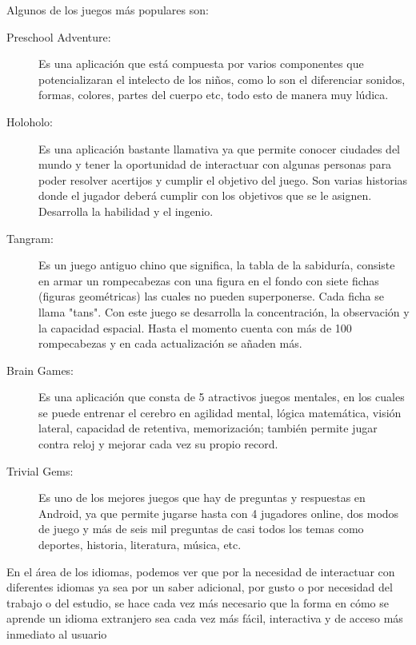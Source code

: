 Algunos de los juegos más populares son:
\begin{description}
	\item[Preschool Adventure:]
		Es una aplicación que está compuesta por varios componentes que potencializaran el intelecto de los niños, como lo son el diferenciar sonidos, formas, colores, partes del 
		cuerpo etc, todo esto de manera muy lúdica.
		
	\item[Holoholo:]
		Es una aplicación bastante llamativa ya que permite conocer ciudades del mundo y tener la oportunidad de interactuar con algunas personas para poder resolver acertijos y 
		cumplir el objetivo del juego. Son varias historias donde el jugador deberá cumplir con los objetivos que se le asignen. Desarrolla la habilidad y el ingenio.
	
	\item[Tangram:]
		Es un juego antiguo chino que significa, la tabla de la sabiduría, consiste en armar un rompecabezas con una figura en el fondo con siete fichas (figuras geométricas) las 	
		cuales no pueden superponerse. Cada ficha se llama "tans". Con este juego se desarrolla la concentración, la observación y la capacidad espacial. Hasta el momento cuenta 
		con más de 100 rompecabezas y en cada actualización se añaden más.
	
	\item[Brain Games:]
		Es una aplicación que consta de 5 atractivos juegos mentales, en los cuales se puede entrenar el cerebro en agilidad mental, lógica matemática, visión lateral, capacidad de 
		retentiva, memorización; también permite jugar contra reloj y mejorar cada vez su propio record.
	
	\item[Trivial Gems:]
		Es uno de los mejores juegos que hay de preguntas y respuestas en Android, ya que permite jugarse hasta con 4 jugadores online, dos modos de juego y más de seis mil 
		preguntas de casi todos los temas como deportes, historia, literatura, música, etc.
\end{description}

En el área de los idiomas, podemos ver que por la necesidad de interactuar con diferentes idiomas ya sea por un saber adicional, por gusto o por necesidad del trabajo o del 
estudio, se hace cada vez más necesario que la forma en cómo se aprende un idioma extranjero sea cada vez más fácil, interactiva y de acceso más inmediato al usuario
 
